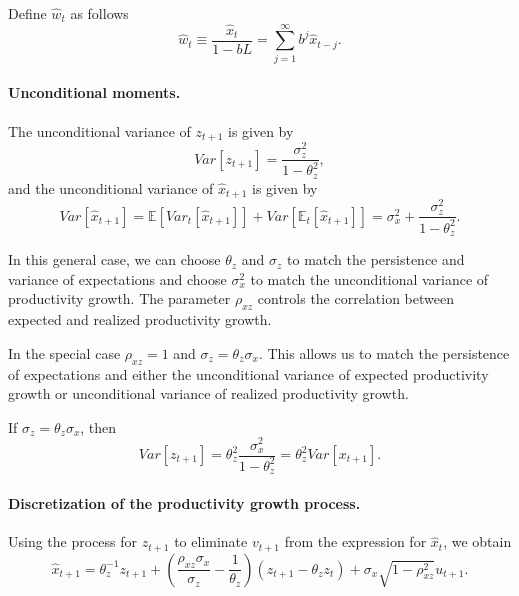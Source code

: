 Define $\hat{w}_t$ as follows
\begin{equation}
    \hat{w}_t \equiv \frac{\hat{x}_t}{1-bL} = \sum_{j=1}^\infty b^j \hat{x}_{t-j}.
\end{equation}

\paragraph{Unconditional moments.} The unconditional variance of $z_{t+1}$ is given by 
\begin{equation}
    Var[z_{t+1}] = \frac{\sigma_z^2}{1-\theta_z^2},
\end{equation}
and the unconditional variance of $\hat{x}_{t+1}$ is given by
\begin{equation}
    Var[\hat{x}_{t+1}] = \mathbb{E}\left[Var_t[\hat{x}_{t+1}] \right] + Var[ \mathbb{E}_t[\hat{x}_{t+1}] ] = \sigma_x^2 + \frac{\sigma_z^2}{1-\theta_z^2}. 
\end{equation}

In this general case, we can choose $\theta_z$ and $\sigma_z$ to match the persistence and variance of expectations and choose $\sigma_x^2$ to match the unconditional variance of productivity growth. The parameter $\rho_{xz}$ controls the correlation between expected and realized productivity growth. 

In the special case $\rho_{xz} = 1$ and $\sigma_z = \theta_z \sigma_x$. 
This allows us to match the persistence of expectations and either the unconditional variance of expected productivity growth or unconditional variance of realized productivity growth. 

If $\sigma_z = \theta_z \sigma_x$, then
\begin{equation}
    Var[z_{t+1}] = \theta_z^2\frac{\sigma_x^2}{1-\theta_z^2} = \theta_z^2 Var[x_{t+1}].
\end{equation}

\paragraph{Discretization of the productivity growth process.}  
Using the process for $z_{t+1}$ to eliminate $v_{t+1}$ from the expression for $\hat{x}_t$, we obtain
\begin{equation}
    \hat{x}_{t+1} = \theta_z^{-1} z_{t+1}  + \left(\frac{\rho_{xz} \sigma_x}{\sigma_z} - \frac{1}{\theta_z}\right)\left(  z_{t+1} - \theta_z z_t \right) + \sigma_x  \sqrt{1 - \rho_{xz}^{2}} u_{t+1}.
\end{equation}

